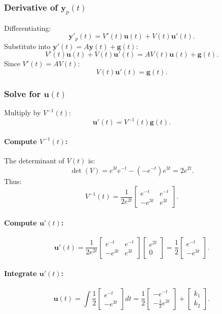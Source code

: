 \documentclass[12pt]{article}
\begin{document}
\subsubsection*{Derivative of \(\mathbf{y}_p(t)\)}
Differentiating:
\[
\mathbf{y}'_p(t) = V'(t)\mathbf{u}(t) + V(t)\mathbf{u}'(t).
\]
Substitute into \( \mathbf{y}'(t) = A\mathbf{y}(t) + \mathbf{g}(t) \):
\[
V'(t)\mathbf{u}(t) + V(t)\mathbf{u}'(t) = AV(t)\mathbf{u}(t) + \mathbf{g}(t).
\]
Since \( V'(t) = AV(t) \):
\[
V(t)\mathbf{u}'(t) = \mathbf{g}(t).
\]

\subsubsection*{Solve for \(\mathbf{u}(t)\)}
Multiply by \( V^{-1}(t) \):
\[
\mathbf{u}'(t) = V^{-1}(t)\mathbf{g}(t).
\]

\paragraph{Compute \(V^{-1}(t)\):}
The determinant of \(V(t)\) is:
\[
\det(V) = e^{3t}e^{-t} - (-e^{-t})e^{3t} = 2e^{2t}.
\]
Thus:
\[
V^{-1}(t) = \frac{1}{2e^{2t}}\begin{bmatrix} e^{-t} & e^{-t} \\ -e^{3t} & e^{3t} \end{bmatrix}.
\]

\paragraph{Compute \(\mathbf{u}'(t)\):}
\[
\mathbf{u}'(t) = \frac{1}{2e^{2t}}\begin{bmatrix} e^{-t} & e^{-t} \\ -e^{3t} & e^{3t} \end{bmatrix}\begin{bmatrix} e^{2t} \\ 0 \end{bmatrix} = \frac{1}{2}\begin{bmatrix} e^{-t} \\ -e^{3t} \end{bmatrix}.
\]

\paragraph{Integrate \(\mathbf{u}'(t)\):}
\[
\mathbf{u}(t) = \int \frac{1}{2}\begin{bmatrix} e^{-t} \\ -e^{3t} \end{bmatrix} dt = \frac{1}{2}\begin{bmatrix} -e^{-t} \\ -\frac{1}{3}e^{3t} \end{bmatrix} + \begin{bmatrix} k_1 \\ k_2 \end{bmatrix}.
\]
\end{document}
